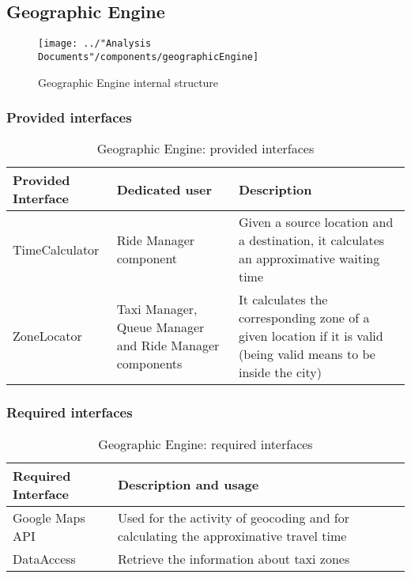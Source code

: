 \subsection{Geographic Engine}
\begin{figure}[H]
	\centering
	\texttt{[image: ../"Analysis Documents"/components/geographicEngine]}
	\label{fig:geographicengine}
	\caption{Geographic Engine internal structure}
\end{figure}
\subsubsection{Provided interfaces}
\begin{table}[H]
	\begin{longtable}{| p{} | p{} | p{} |}
		\hline
		\textbf{Provided Interface} & \textbf{Dedicated user} & \textbf{Description} \\ \hline
		TimeCalculator & Ride Manager component & Given a source location and a destination, it calculates an approximative waiting time \\ \hline
		ZoneLocator & Taxi Manager, Queue Manager and Ride Manager components & It calculates the corresponding zone of a given location if it is valid (being valid means to be inside the city) \\ \hline
	\end{longtable}
	\caption{Geographic Engine: provided interfaces}
	\label{tab:geographicengine:providedInterfaces}
\end{table}
\subsubsection{Required interfaces}
\begin{table}[H]
	\begin{longtable}{| l | p{} |}
		\hline
		\textbf{Required Interface} & \textbf{Description and usage} \\ \hline
		Google Maps API & Used for the activity of geocoding and for calculating the approximative travel time \\ \hline
		DataAccess & Retrieve the information about taxi zones \\ \hline
	\end{longtable}
	\caption{Geographic Engine: required interfaces}
	\label{tab:geographicengine:requiredInterfaces}
\end{table}
